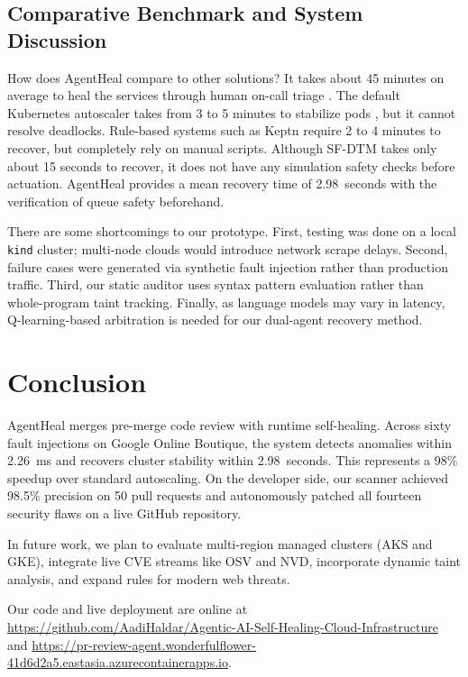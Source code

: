 \documentclass[10pt,conference]{IEEEtran}
\begin{document}
\subsection{Comparative Benchmark and System Discussion}

How does AgentHeal compare to other solutions? It takes about 45 minutes on average to heal the services through human on-call triage \cite{dora2024}. The default Kubernetes autoscaler takes from 3 to 5 minutes to stabilize pods \cite{hpa}, but it cannot resolve deadlocks. Rule-based systems such as Keptn \cite{keptn} require 2 to 4 minutes to recover, but completely rely on manual scripts. Although SF-DTM \cite{sfdtm} takes only about 15 seconds to recover, it does not have any simulation safety checks before actuation. AgentHeal provides a mean recovery time of 2.98~seconds with the verification of queue safety beforehand.

There are some shortcomings to our prototype. First, testing was done on a local \texttt{kind} cluster; multi-node clouds would introduce network scrape delays. Second, failure cases were generated via synthetic fault injection rather than production traffic. Third, our static auditor uses syntax pattern evaluation rather than whole-program taint tracking. Finally, as language models may vary in latency, Q-learning-based arbitration is needed for our dual-agent recovery method. \enlargethispage{2\baselineskip}

\section{Conclusion}

AgentHeal merges pre-merge code review with runtime self-healing. Across sixty fault injections on Google Online Boutique, the system detects anomalies within 2.26~ms and recovers cluster stability within 2.98~seconds. This represents a 98\% speedup over standard autoscaling. On the developer side, our scanner achieved 98.5\% precision on 50 pull requests and autonomously patched all fourteen security flaws on a live GitHub repository.

In future work, we plan to evaluate multi-region managed clusters (AKS and GKE), integrate live CVE streams like OSV and NVD, incorporate dynamic taint analysis, and expand rules for modern web threats.

Our code and live deployment are online at \url{https://github.com/AadiHaldar/Agentic-AI-Self-Healing-Cloud-Infrastructure} and \url{https://pr-review-agent.wonderfulflower-41d6d2a5.eastasia.azurecontainerapps.io}.
\end{document}
